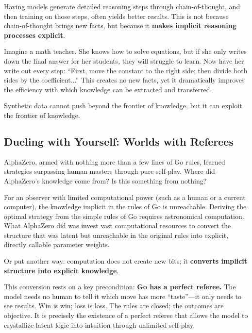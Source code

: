 Having models generate detailed reasoning steps through chain-of-thought, and then training on those steps, often yields better results. This is not because chain-of-thought brings new facts, but because it \textbf{makes implicit reasoning processes explicit}.

\vspace{1em}

Imagine a math teacher. She knows how to solve equations, but if she only writes down the final answer for her students, they will struggle to learn. Now have her write out every step: ``First, move the constant to the right side; then divide both sides by the coefficient...'' This creates no new facts, yet it dramatically improves the efficiency with which knowledge can be extracted and transferred.

\begin{importantbox}
Synthetic data cannot push beyond the frontier of knowledge, but it can exploit the frontier of knowledge.
\end{importantbox}

\subsection{Dueling with Yourself: Worlds with Referees}

AlphaZero, armed with nothing more than a few lines of Go rules, learned strategies surpassing human masters through pure self-play. Where did AlphaZero's knowledge come from? Is this something from nothing?

\vspace{1em}

For an observer with limited computational power (such as a human or a current computer), the knowledge implicit in the rules of Go is unreachable. Deriving the optimal strategy from the simple rules of Go requires astronomical computation. What AlphaZero did was invest vast computational resources to convert the structure that was latent but unreachable in the original rules into explicit, directly callable parameter weights.

Or put another way: computation does not create new bits; it \textbf{converts implicit structure into explicit knowledge}.

\vspace{1em}

This conversion rests on a key precondition: \textbf{Go has a perfect referee.} The model needs no human to tell it which move has more ``taste''---it only needs to see results.
Win is win; loss is loss. The rules are closed; the outcomes are objective. It is precisely the existence of a perfect referee that allows the model to crystallize latent logic into intuition through unlimited self-play.

